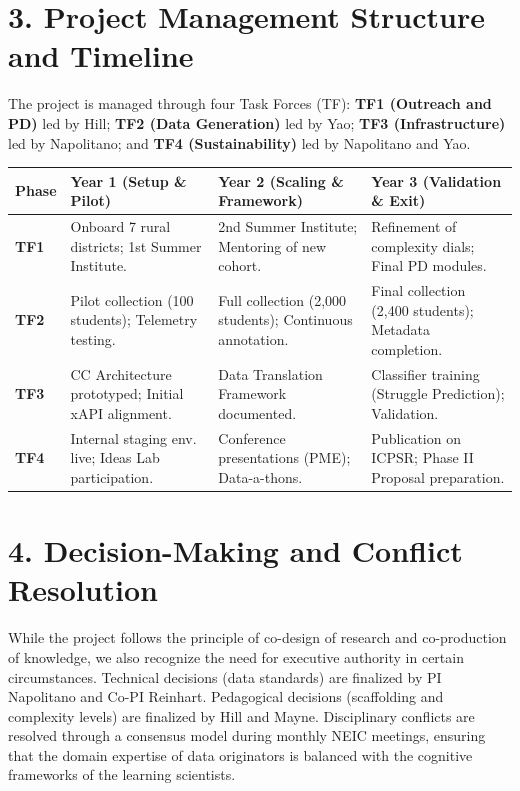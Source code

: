 \documentclass[11pt]{article}
\begin{document}
\section*{3. Project Management Structure and Timeline}
The project is managed through four Task Forces (TF): \textbf{TF1 (Outreach and PD)} led by Hill; \textbf{TF2 (Data Generation)} led by Yao; \textbf{TF3 (Infrastructure)} led by Napolitano; and \textbf{TF4 (Sustainability)} led by Napolitano and Yao.

\begin{table}[h!]
\small
\centering
\begin{tabularx}{\textwidth}{@{}l XXX@{}}
\toprule
\textbf{Phase} & \textbf{Year 1 (Setup \& Pilot)} & \textbf{Year 2 (Scaling \& Framework)} & \textbf{Year 3 (Validation \& Exit)} \\ \midrule
\textbf{TF1} & Onboard 7 rural districts; 1st Summer Institute. & 2nd Summer Institute; Mentoring of new cohort. & Refinement of complexity dials; Final PD modules. \\ \addlinespace
\textbf{TF2} & Pilot collection (100 students); Telemetry testing. & Full collection (2,000 students); Continuous annotation. & Final collection (2,400 students); Metadata completion. \\ \addlinespace
\textbf{TF3} & CC Architecture prototyped; Initial xAPI alignment. & Data Translation Framework documented. & Classifier training (Struggle Prediction); Validation. \\ \addlinespace
\textbf{TF4} & Internal staging env. live; Ideas Lab participation. & Conference presentations (PME); Data-a-thons. & Publication on ICPSR; Phase II Proposal preparation. \\ \bottomrule
\end{tabularx}
\end{table}

\section*{4. Decision-Making and Conflict Resolution}
While the project follows the principle of co-design of research and co-production of knowledge, we also recognize the need for executive authority in certain circumstances.
Technical decisions (data standards) are finalized by PI Napolitano and Co-PI Reinhart.
Pedagogical decisions (scaffolding and complexity levels) are finalized by Hill and Mayne. 
Disciplinary conflicts are resolved through a consensus model during monthly NEIC meetings, ensuring that the domain expertise of data originators is balanced with the cognitive frameworks of the learning scientists.
\end{document}
